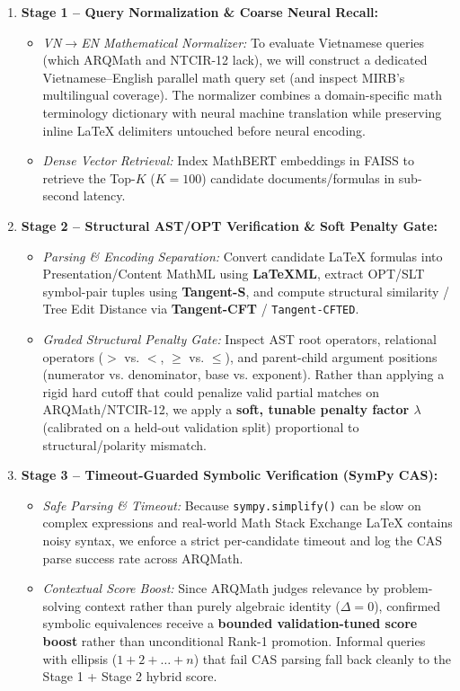 \documentclass[11pt,a4paper]{article}
\begin{document}
	\begin{enumerate}
		\item \textbf{Stage 1 -- Query Normalization \& Coarse Neural Recall:}
		\begin{itemize}
			\item \textit{VN$\to$EN Mathematical Normalizer:} To evaluate Vietnamese queries (which ARQMath and NTCIR-12 lack), we will construct a dedicated Vietnamese--English parallel math query set (and inspect MIRB's multilingual coverage). The normalizer combines a domain-specific math terminology dictionary with neural machine translation while preserving inline \LaTeX{} delimiters untouched before neural encoding.
			\item \textit{Dense Vector Retrieval:} Index MathBERT embeddings in FAISS to retrieve the Top-$K$ ($K=100$) candidate documents/formulas in sub-second latency.
		\end{itemize}
		\item \textbf{Stage 2 -- Structural AST/OPT Verification \& Soft Penalty Gate:}
		\begin{itemize}
			\item \textit{Parsing \& Encoding Separation:} Convert candidate \LaTeX{} formulas into Presentation/Content MathML using \textbf{LaTeXML}, extract OPT/SLT symbol-pair tuples using \textbf{Tangent-S}, and compute structural similarity / Tree Edit Distance via \textbf{Tangent-CFT} / \texttt{Tangent-CFTED}.
			\item \textit{Graded Structural Penalty Gate:} Inspect AST root operators, relational operators ($>$ vs. $<$, $\ge$ vs. $\le$), and parent-child argument positions (numerator vs. denominator, base vs. exponent). Rather than applying a rigid hard cutoff that could penalize valid partial matches on ARQMath/NTCIR-12, we apply a \textbf{soft, tunable penalty factor $\lambda$} (calibrated on a held-out validation split) proportional to structural/polarity mismatch.
		\end{itemize}
		\item \textbf{Stage 3 -- Timeout-Guarded Symbolic Verification (SymPy CAS):}
		\begin{itemize}
			\item \textit{Safe Parsing \& Timeout:} Because \texttt{sympy.simplify()} can be slow on complex expressions and real-world Math Stack Exchange \LaTeX{} contains noisy syntax, we enforce a strict per-candidate timeout and log the CAS parse success rate across ARQMath.
			\item \textit{Contextual Score Boost:} Since ARQMath judges relevance by problem-solving context rather than purely algebraic identity ($\Delta = 0$), confirmed symbolic equivalences receive a \textbf{bounded validation-tuned score boost} rather than unconditional Rank-1 promotion. Informal queries with ellipsis ($1+2+\dots+n$) that fail CAS parsing fall back cleanly to the Stage 1 + Stage 2 hybrid score.

\end{itemize}
\end{enumerate}
\end{document}
